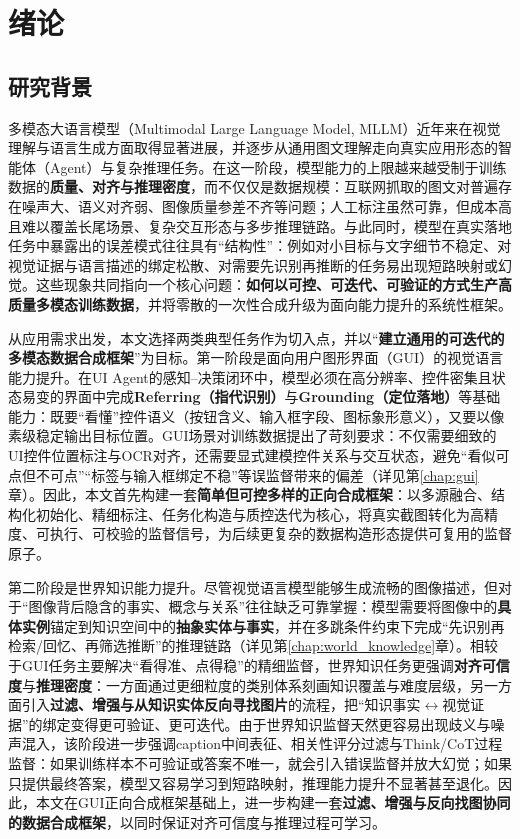 \chapter{绪论}

\section{研究背景}

多模态大语言模型（Multimodal Large Language Model, MLLM）近年来在视觉理解与语言生成方面取得显著进展，并逐步从通用图文理解走向真实应用形态的智能体（Agent）与复杂推理任务。在这一阶段，模型能力的上限越来越受制于训练数据的\textbf{质量、对齐与推理密度}，而不仅仅是数据规模：互联网抓取的图文对普遍存在噪声大、语义对齐弱、图像质量参差不齐等问题；人工标注虽然可靠，但成本高且难以覆盖长尾场景、复杂交互形态与多步推理链路。与此同时，模型在真实落地任务中暴露出的误差模式往往具有“结构性”：例如对小目标与文字细节不稳定、对视觉证据与语言描述的绑定松散、对需要先识别再推断的任务易出现短路映射或幻觉。这些现象共同指向一个核心问题：\textbf{如何以可控、可迭代、可验证的方式生产高质量多模态训练数据}，并将零散的一次性合成升级为面向能力提升的系统性框架\citep{chen2023sharegpt4v,xu2024mmevol,liu2025synthvlm}。

从应用需求出发，本文选择两类典型任务作为切入点，并以“\textbf{建立通用的可迭代的多模态数据合成框架}”为目标。第一阶段是面向用户图形界面（GUI）的视觉语言能力提升。在UI Agent的感知--决策闭环中，模型必须在高分辨率、控件密集且状态易变的界面中完成\textbf{Referring（指代识别）}与\textbf{Grounding（定位落地）}等基础能力：既要“看懂”控件语义（按钮含义、输入框字段、图标象形意义），又要以像素级稳定输出目标位置。GUI场景对训练数据提出了苛刻要求：不仅需要细致的UI控件位置标注与OCR对齐，还需要显式建模控件关系与交互状态，避免“看似可点但不可点”“标签与输入框绑定不稳”等误监督带来的偏差（详见第\ref{chap:gui}章）。因此，本文首先构建一套\textbf{简单但可控多样的正向合成框架}：以多源融合、结构化初始化、精细标注、任务化构造与质控迭代为核心，将真实截图转化为高精度、可执行、可校验的监督信号，为后续更复杂的数据构造形态提供可复用的监督原子。

第二阶段是世界知识能力提升。尽管视觉语言模型能够生成流畅的图像描述，但对于“图像背后隐含的事实、概念与关系”往往缺乏可靠掌握：模型需要将图像中的\textbf{具体实例}锚定到知识空间中的\textbf{抽象实体与事实}，并在多跳条件约束下完成“先识别再检索/回忆、再筛选推断”的推理链路（详见第\ref{chap:world_knowledge}章）。相较于GUI任务主要解决“看得准、点得稳”的精细监督，世界知识任务更强调\textbf{对齐可信度}与\textbf{推理密度}：一方面通过更细粒度的类别体系刻画知识覆盖与难度层级，另一方面引入\textbf{过滤、增强与从知识实体反向寻找图片}的流程，把“知识事实$\leftrightarrow$视觉证据”的绑定变得更可验证、更可迭代。由于世界知识监督天然更容易出现歧义与噪声混入，该阶段进一步强调caption中间表征、相关性评分过滤与Think/CoT过程监督：如果训练样本不可验证或答案不唯一，就会引入错误监督并放大幻觉；如果只提供最终答案，模型又容易学习到短路映射，推理能力提升不显著甚至退化。因此，本文在GUI正向合成框架基础上，进一步构建一套\textbf{过滤、增强与反向找图协同的数据合成框架}，以同时保证对齐可信度与推理过程可学习。


